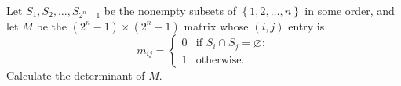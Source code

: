 Let $S_1,S_2,\ldots,S_{2^n-1}$ be the nonempty subsets of $\left\{1,2,\ldots,n\right\}$ in some order, and let $M$ be the $\left(2^n-1\right)\times\left(2^n-1\right)$ matrix whose $\left(i,j\right)$ entry is \[m_{ij}=
\begin{cases}
	0 & \text{if }S_i\cap S_j=\varnothing; \\
	1 & \text{otherwise.}
\end{cases}
\] Calculate the determinant of $M$.